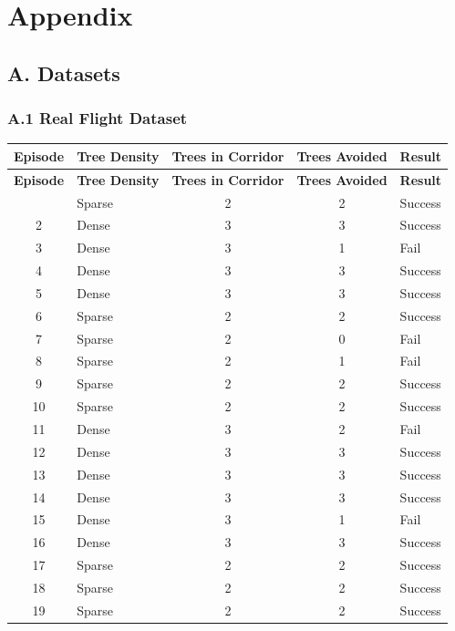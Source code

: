 \documentclass[../main.tex]{subfiles}
\begin{document}
\section*{Appendix}

\subsection*{A. Datasets}

\subsubsection*{A.1 Real Flight Dataset}

\begin{center}
\small
\begin{longtable}{|c|l|c|c|l|}
\hline
\textbf{Episode} & \textbf{Tree Density} & \textbf{Trees in Corridor} & \textbf{Trees Avoided} & \textbf{Result} \\
\hline
\endfirsthead
\hline
\textbf{Episode} & \textbf{Tree Density} & \textbf{Trees in Corridor} & \textbf{Trees Avoided} & \textbf{Result} \\
\hline
\endhead
\hline
\endfoot
    1 & Sparse & 2 & 2 & Success \\
    2 & Dense & 3 & 3 & Success \\
    3 & Dense & 3 & 1 & Fail \\
    4 & Dense & 3 & 3 & Success \\
    5 & Dense & 3 & 3 & Success \\
    6 & Sparse & 2 & 2 & Success \\
    7 & Sparse & 2 & 0 & Fail \\
    8 & Sparse & 2 & 1 & Fail \\
    9 & Sparse & 2 & 2 & Success \\
    10 & Sparse & 2 & 2 & Success \\
    11 & Dense & 3 & 2 & Fail \\
    12 & Dense & 3 & 3 & Success \\
    13 & Dense & 3 & 3 & Success \\
    14 & Dense & 3 & 3 & Success \\
    15 & Dense & 3 & 1 & Fail \\
    16 & Dense & 3 & 3 & Success \\
    17 & Sparse & 2 & 2 & Success \\
    18 & Sparse & 2 & 2 & Success \\
    19 & Sparse & 2 & 2 & Success \\

\end{longtable}
\end{center}
\end{document}
